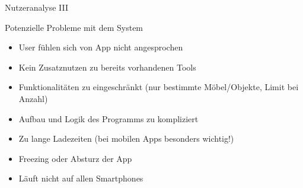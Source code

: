 \documentclass[presentation,bigger,aspectratio=169]{beamer}
\begin{document}
\begin{frame}[label={sec:org7347fb1}]{Nutzeranalyse III}
\begin{block}{Potenzielle Probleme mit dem System}
\begin{itemize}
\item User fühlen sich von App nicht angesprochen
\item Kein Zusatznutzen zu bereits vorhandenen Tools
\item Funktionalitäten zu eingeschränkt (nur bestimmte Möbel/Objekte,
Limit bei Anzahl)
\item Aufbau und Logik des Programms zu kompliziert
\item Zu lange Ladezeiten (bei mobilen Apps besonders wichtig!)
\item Freezing oder Absturz der App
\item Läuft nicht auf allen Smartphones
\end{itemize}
\end{block}
\end{frame}
\end{document}
